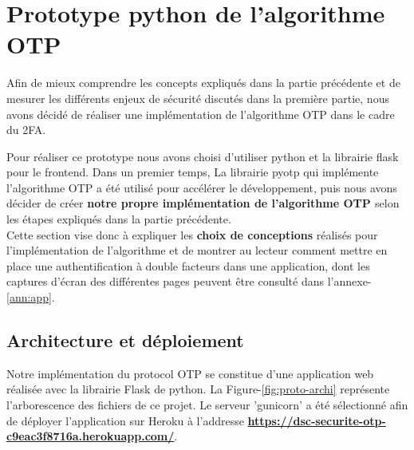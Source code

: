 \documentclass[a4paper, 10pt]{article}
\newcommand{\otp}{\textsc{OTP} }
\begin{document}
\newpage
    \section{Prototype python de l'algorithme \otp}

    Afin de \textcolor{myblue}{mieux comprendre les concepts} expliqués dans la partie précédente et de mesurer les différents enjeux de sécurité discutés dans la première partie, nous avons décidé de réaliser une \textcolor{myblue}{implémentation de l'algorithme \otp dans le cadre du 2FA}.

    Pour réaliser ce prototype nous avons choisi d'utiliser \textcolor{mygreen}{python} et la \textcolor{mygreen}{librairie flask} pour le frontend. Dans un premier temps, La librairie \textcolor{mygreen}{pyotp} qui implémente l'algorithme \otp a été utilisé pour accélérer le développement, puis nous avons décider de créer \textbf{\textcolor{mygreen}{notre propre implémentation de l'algorithme \otp}} selon les étapes expliqués dans la partie précédente.\\

    Cette section vise donc à expliquer les \textbf{choix de conceptions} réalisés pour l'implémentation de l'algorithme et de montrer au lecteur comment \textcolor{myblue}{mettre en place une authentification à double facteurs} dans une application, dont les captures d'écran des différentes pages peuvent être consulté dans l'annexe-\ref{ann:app}.



    \subsection{Architecture et déploiement}

    Notre implémentation du protocol \otp se constitue d'une \textcolor{mygreen}{application web} réalisée avec la librairie Flask de python. La Figure-\ref{fig:proto-archi} représente l'arborescence des fichiers de ce projet. Le serveur '\textcolor{mygreen}{gunicorn}' a été sélectionné afin de déployer l'application sur Heroku à l'addresse \textbf{\url{https://dsc-securite-otp-c9eac3f8716a.herokuapp.com/}}.\\
\end{document}
